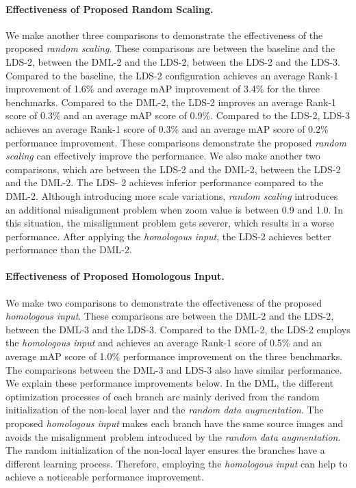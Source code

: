 \documentclass[a4paper]{cas-dc}
\begin{document}
\paragraph{Effectiveness of Proposed Random Scaling.}
We make another three comparisons to demonstrate the effectiveness of the proposed \textit{random scaling}. These comparisons are between the baseline and the LDS-2, between the DML-2 and the LDS-2, between the LDS-2 and the LDS-3. Compared to the baseline, the LDS-2 configuration achieves an average Rank-1 improvement of 1.6\% and average mAP improvement of 3.4\% for the three benchmarks. Compared to the DML-2, the LDS-2 improves an average Rank-1 score of 0.3\% and an average mAP score of 0.9\%. Compared to the LDS-2, LDS-3 achieves an average Rank-1 score of 0.3\% and an average mAP score of 0.2\% performance improvement. These comparisons demonstrate the proposed \textit{random scaling} can effectively improve the performance. 
We also make another two comparisons, which are between the LDS-2 and the DML-2, between the LDS-2 and the DML-2. The LDS- 2 achieves inferior performance compared to the DML-2. Although introducing more scale variations, \textit{random scaling} introduces an additional misalignment problem when zoom value is between 0.9 and 1.0. In this situation, the misalignment problem gets severer, which results in a worse performance. After applying the \textit{homologous input}, the LDS-2 achieves better performance than the DML-2.

\paragraph{Effectiveness of Proposed Homologous Input.}
We make two comparisons to demonstrate the effectiveness of the proposed \textit{homologous input}. These comparisons are between the DML-2 and the LDS-2, between the DML-3 and the LDS-3. Compared to the DML-2, the LDS-2 employs the \textit{homologous input} and achieves an average Rank-1 score of 0.5\% and an average mAP score of 1.0\% performance improvement on the three benchmarks. The comparisons between the DML-3 and LDS-3 also have similar performance. We explain these performance improvements below. In the DML, the different optimization processes of each branch are mainly derived from the random initialization of the non-local layer and the \textit{random data augmentation}. The proposed \textit{homologous input} makes each branch have the same source images and avoids the misalignment problem introduced by the \textit{random data augmentation}. The random initialization of the non-local layer ensures the branches have a different learning process. Therefore, employing the \textit{homologous input} can help to achieve a noticeable performance improvement. 
\end{document}
